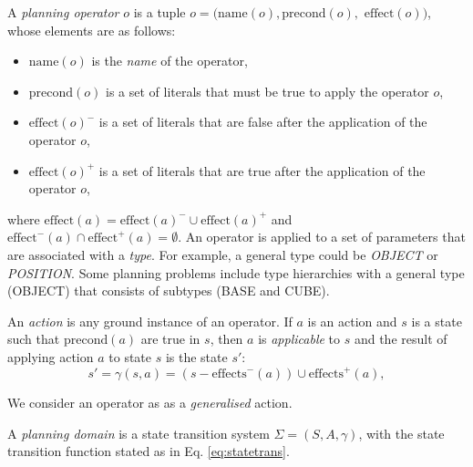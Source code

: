 \begin{definition}
A \textit{planning operator} $o$ is a tuple $o = (\text{name}(o), \text{precond}(o),$ $\text{effect}(o))$, whose elements are as follows:
\begin{itemize}
	\item $\text{name}(o)$ is the {\em name} of the operator,
	\item $\text{precond}(o)$ is a set of literals that must be true to apply the operator $o$,
	\item $\text{effect}(o)^{-}$ is a set of literals that are false after the application of the operator $o$,
	\item $\text{effect}(o)^{+}$ is a set of literals that are true after the application of the operator $o$,
\end{itemize}
\end{definition}
where $\text{effect}(a) = \text{effect}(a)^{-} \cup \text{effect}(a)^{+}$ and $\text{effect}^{-}(a) \cap \text{effect}^{+}(a) = \emptyset$. 
An operator is applied to a set of parameters that are associated with a \textit{type}.
For example, a general type could be \textit{OBJECT} or \textit{POSITION}.
Some planning problems include type hierarchies with a general type (\eg OBJECT) that consists of subtypes (\eg BASE and CUBE).

\begin{definition}\label{def:action}
	An \textit{action} is any ground instance of an operator. 
	If $a$ is an action and $s$ is a state such that $\text{precond}(a)$ are true in $s$, then $a$ is {\em applicable} to $s$ and the result of applying action $a$ to state $s$ is the state $s'$:  
	\begin{equation}\label{eq:statetrans}
		s' = \gamma(s, a) = (s - \text{effects}^{-}(a)) \cup \text{effects}^{+}(a),
	\end{equation}
	
\end{definition}

We consider an operator as as a \textit{generalised} action.

\begin{definition}
A \textit{planning domain} is a state transition system $\Sigma = (S, A, \gamma)$, with the state transition function stated as in Eq. \ref{eq:statetrans}.
\end{definition}


